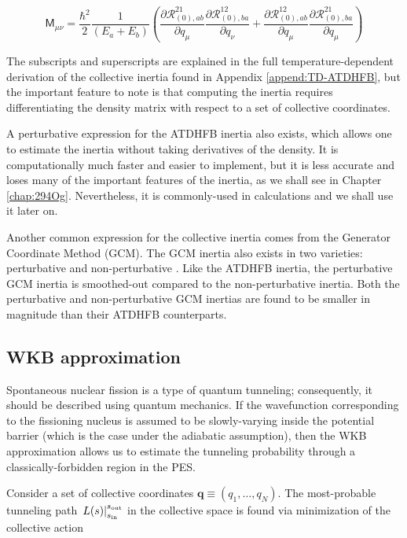 \begin{equation}\label{eq:mATDHFB-np}
\mathsf{M}_{\mu\nu} =  \frac{\hbar^2}{2}\frac{1}{(E_a+E_b)}\left(\frac{\partial\mathcal{R}^{21}_{(0),ab}}{\partial q_\mu}\frac{\partial\mathcal{R}^{12}_{(0),ba}}{\partial q_\nu}+\frac{\partial\mathcal{R}^{12}_{(0),ab}}{\partial q_\mu}\frac{\partial\mathcal{R}^{21}_{(0),ba}}{\partial q_\mu}\right)
\end{equation}

\noindent The subscripts and superscripts are explained in the full temperature-dependent derivation of the collective inertia found in Appendix \ref{append:TD-ATDHFB}, but the important feature to note is that computing the inertia requires differentiating the density matrix with respect to a set of collective coordinates.

A perturbative expression for the ATDHFB inertia also exists, which allows one to estimate the inertia without taking derivatives of the density. It is computationally much faster and easier to implement, but it is less accurate and loses many of the important features of the inertia, as we shall see in Chapter \ref{chap:294Og}. Nevertheless, it is commonly-used in calculations and we shall use it later on.

Another common expression for the collective inertia comes from the Generator Coordinate Method (GCM). The GCM inertia also exists in two varieties: perturbative and non-perturbative \cite{Giuliani2018b}. Like the ATDHFB inertia, the perturbative GCM inertia is smoothed-out compared to the non-perturbative inertia. Both the perturbative and non-perturbative GCM inertias are found to be smaller in magnitude than their ATDHFB counterparts.

\subsection{WKB approximation}\label{sect:wkb}
Spontaneous nuclear fission is a type of quantum tunneling; consequently, it should be described using quantum mechanics. If the wavefunction corresponding to the fissioning nucleus is assumed to be slowly-varying inside the potential barrier (which is the case under the adiabatic assumption), then the WKB approximation allows us to estimate the tunneling probability through a classically-forbidden region in the PES.

Consider a set of collective coordinates $\mathbf{q}\equiv(q_1, \ldots, q_N)$. The most-probable tunneling path $\left. L(s) \right|_{s_{\rm in}}^{s_{\rm out}}$ in the collective space is found via minimization of the collective action


